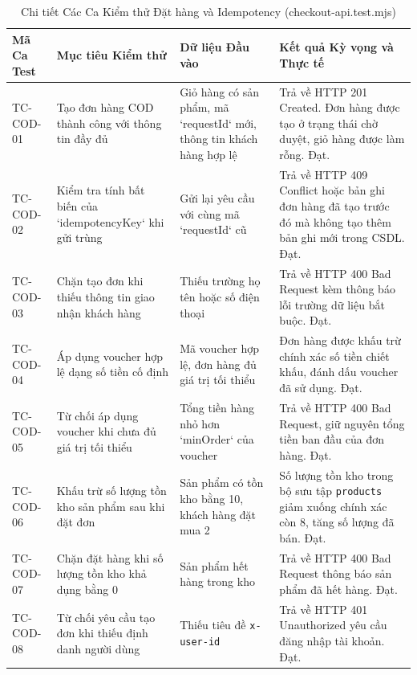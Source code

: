 \begin{table}[H]
\centering
\caption{Chi tiết Các Ca Kiểm thử Đặt hàng và Idempotency (checkout-api.test.mjs)}
\label{tab:test_checkout_spec}
\begin{tabularx}{\textwidth}{p{2cm}p{3.8cm}p{3cm}X}
\toprule
\textbf{Mã Ca Test} & \textbf{Mục tiêu Kiểm thử} & \textbf{Dữ liệu Đầu vào} & \textbf{Kết quả Kỳ vọng và Thực tế} \\
\midrule
TC-COD-01 & Tạo đơn hàng COD thành công với thông tin đầy đủ & Giỏ hàng có sản phẩm, mã `requestId` mới, thông tin khách hàng hợp lệ & Trả về HTTP 201 Created. Đơn hàng được tạo ở trạng thái chờ duyệt, giỏ hàng được làm rỗng. Đạt. \\
\addlinespace
TC-COD-02 & Kiểm tra tính bất biến của `idempotencyKey` khi gửi trùng & Gửi lại yêu cầu với cùng mã `requestId` cũ & Trả về HTTP 409 Conflict hoặc bản ghi đơn hàng đã tạo trước đó mà không tạo thêm bản ghi mới trong CSDL. Đạt. \\
\addlinespace
TC-COD-03 & Chặn tạo đơn khi thiếu thông tin giao nhận khách hàng & Thiếu trường họ tên hoặc số điện thoại & Trả về HTTP 400 Bad Request kèm thông báo lỗi trường dữ liệu bắt buộc. Đạt. \\
\addlinespace
TC-COD-04 & Áp dụng voucher hợp lệ dạng số tiền cố định & Mã voucher hợp lệ, đơn hàng đủ giá trị tối thiểu & Đơn hàng được khấu trừ chính xác số tiền chiết khấu, đánh dấu voucher đã sử dụng. Đạt. \\
\addlinespace
TC-COD-05 & Từ chối áp dụng voucher khi chưa đủ giá trị tối thiểu & Tổng tiền hàng nhỏ hơn `minOrder` của voucher & Trả về HTTP 400 Bad Request, giữ nguyên tổng tiền ban đầu của đơn hàng. Đạt. \\
\addlinespace
TC-COD-06 & Khấu trừ số lượng tồn kho sản phẩm sau khi đặt đơn & Sản phẩm có tồn kho bằng 10, khách hàng đặt mua 2 & Số lượng tồn kho trong bộ sưu tập \texttt{products} giảm xuống chính xác còn 8, tăng số lượng đã bán. Đạt. \\
\addlinespace
TC-COD-07 & Chặn đặt hàng khi số lượng tồn kho khả dụng bằng 0 & Sản phẩm hết hàng trong kho & Trả về HTTP 400 Bad Request thông báo sản phẩm đã hết hàng. Đạt. \\
\addlinespace
TC-COD-08 & Từ chối yêu cầu tạo đơn khi thiếu định danh người dùng & Thiếu tiêu đề \texttt{x-user-id} & Trả về HTTP 401 Unauthorized yêu cầu đăng nhập tài khoản. Đạt. \\
\bottomrule
\end{tabularx}
\end{table}

